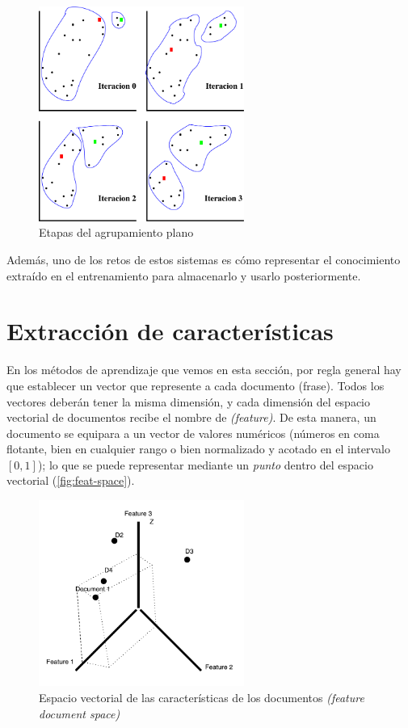 \begin{figure}[htbp]
\centering
\includegraphics[width=0.6\textwidth]{k-medias}
\caption[Etapas del agrupamiento plano]{Etapas del agrupamiento plano \citep{RuizReina2013}}
\label{fig:k-medias}
\end{figure}

Además, uno de los retos de estos sistemas es cómo representar el conocimiento extraído en el entrenamiento para almacenarlo y usarlo posteriormente.

\section{Extracción de características}

En los métodos de aprendizaje que vemos en esta sección, por regla general hay que establecer un vector que represente a cada documento (frase). Todos los vectores deberán tener la misma dimensión, y cada dimensión del espacio vectorial de documentos recibe el nombre de  \emph{(feature)}. De esta manera, un documento se equipara a un vector de valores numéricos (números en coma flotante, bien en cualquier rango o bien normalizado y acotado en el intervalo $[0,1]$); lo que se puede representar mediante un \emph{punto} dentro del espacio vectorial (\autoref{fig:feat-space}).

\begin{figure}[htbp]
\centering
{}
\includegraphics[width=0.6\textwidth]{feat-space}
\caption{Espacio vectorial de las características de los documentos \emph{(feature document space)}}
\label{fig:feat-space}
\end{figure}

